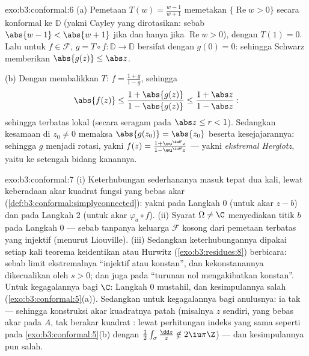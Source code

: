 \begin{solution}{exo:b3:conformal:6}
(a) Pemetaan $T(w) = \frac{w - 1}{w + 1}$ memetakan $\{\operatorname{Re}w >
0\}$ secara konformal ke $\mathbb D$ (yakni Cayley yang dirotasikan: sebab $\abs{w -
1} < \abs{w + 1}$ jika dan hanya jika $\operatorname{Re}w > 0$), dengan $T(1) =
0$. Lalu untuk $f \in \mathcal F$, $g = T\circ f\colon \mathbb D \to
\mathbb D$ bersifat  dengan $g(0) = 0$: sehingga Schwarz memberikan
$\abs{g(z)} \leq \abs z$.

(b) Dengan membalikkan $T$: $f = \frac{1 + g}{1 - g}$, sehingga
\[
\abs{f(z)} \leq \frac{1 + \abs{g(z)}}{1 - \abs{g(z)}}
\leq \frac{1 + \abs z}{1 - \abs z} :
\]
sehingga terbatas lokal (secara seragam pada $\abs z \leq r < 1$). Sedangkan kesamaan
di $z_0 \neq 0$ memaksa $\abs{g(z_0)} = \abs{z_0}$ beserta
kesejajarannya: sehingga $g$ menjadi rotasi, yakni $f(z) = \frac{1 +
\eu^{\iu\theta}z}{1 - \eu^{\iu\theta}z}$ --- yakni
\emph{ekstremal Herglotz}, yaitu  ke setengah bidang
kanannya.
\end{solution}

\begin{solution}{exo:b3:conformal:7}
(i) Keterhubungan sederhananya masuk tepat dua kali, lewat
keberadaan akar kuadrat  fungsi yang bebas akar
(\cref{def:b3:conformal:simplyconnected}): yakni pada Langkah 0 (untuk akar
$z - b$) dan pada Langkah 2 (untuk akar $\varphi_a\circ f$).
(ii) Syarat $\Omega \neq \C$ menyediakan titik $b$ pada Langkah 0 ---
sebab tanpanya keluarga $\mathcal F$ kosong dari pemetaan terbatas yang
injektif (menurut Liouville). (iii) Sedangkan keterhubungannya dipakai setiap kali
teorema keidentikan atau Hurwitz (\cref{exo:b3:residues:8})
berbicara: sebab limit ekstremalnya ``injektif atau konstan'', dan
kekonstanannya dikecualikan oleh $s > 0$; dan juga pada ``turunan nol
mengakibatkan konstan''. Untuk kegagalannya bagi $\C$: Langkah 0 mustahil, dan
kesimpulannya salah (\cref{exo:b3:conformal:5}(a)).
Sedangkan untuk kegagalannya bagi anulusnya: ia tak  --- sehingga
konstruksi akar kuadratnya patah (misalnya $z$ sendiri, yang bebas akar
pada $A$, tak berakar kuadrat : lewat perhitungan indeks
yang sama seperti pada \cref{exo:b3:conformal:5}(b) dengan
$\frac12\int_\sigma\frac{\dd z}z \notin 2\iu\pi\Z$) --- dan
kesimpulannya pun salah.
\end{solution}

